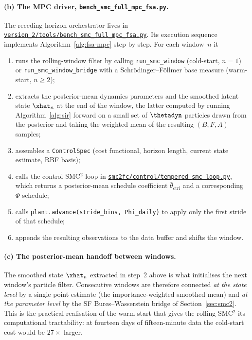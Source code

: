\paragraph{(b) The MPC driver,
\texttt{bench\_smc\_full\_mpc\_fsa.py}.} The receding-horizon
orchestrator lives in
\href{run:../version_2/tools/bench_smc_full_mpc_fsa.py}{\texttt{version\_2/tools/bench\_smc\_full\_mpc\_fsa.py}}.
Its execution sequence implements Algorithm~\ref{alg:fsa-mpc} step by
step. For each window~$n$ it
\begin{enumerate}
  \item runs the rolling-window filter by calling
        \verb|run_smc_window| (cold-start, $n=1$) or
        \verb|run_smc_window_bridge| with a Schr\"odinger--F\"ollmer
        base measure (warm-start, $n\ge 2$);
  \item extracts the posterior-mean dynamics parameters and the
        smoothed latent state $\xhat_n$ at the end of the window, the
        latter computed by running Algorithm~\ref{alg:sir} forward on a
        small set of $\thetadyn$ particles drawn from the posterior and
        taking the weighted mean of the resulting $(B,F,A)$ samples;
  \item assembles a \texttt{ControlSpec} (cost functional, horizon
        length, current state estimate, RBF basis);
  \item calls the control SMC${}^2$ loop in
        \href{run:../smc2fc/control/tempered_smc_loop.py}{\texttt{smc2fc/control/tempered\_smc\_loop.py}},
        which returns a posterior-mean schedule coefficient
        $\bar\theta_{\mathrm{ctrl}}$ and a corresponding $\Phi$
        schedule;
  \item calls \verb|plant.advance(stride_bins, Phi_daily)| to apply
        only the first stride of that schedule;
  \item appends the resulting observations to the data buffer and
        shifts the window.
\end{enumerate}

\paragraph{(c) The posterior-mean handoff between windows.} The smoothed
state $\xhat_n$ extracted in step~2 above is what initialises the next
window's particle filter. Consecutive windows are therefore connected
\emph{at the state level} by a single point estimate (the importance-weighted
smoothed mean) and \emph{at the parameter level} by the SF
Bures--Wasserstein bridge of Section~\ref{sec:smc2}. This is the
practical realisation of the warm-start that gives the rolling SMC${}^2$
its computational tractability: at fourteen days of fifteen-minute data
the cold-start cost would be $27\times$ larger.

